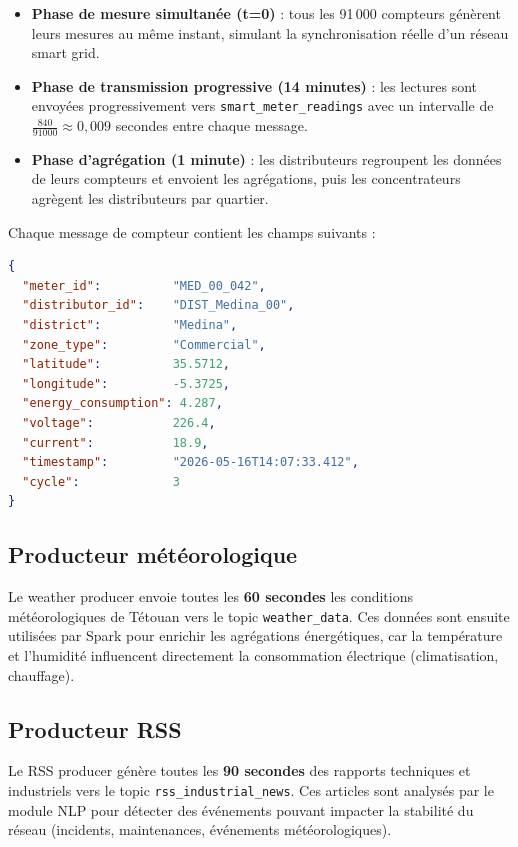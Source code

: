 \documentclass[12pt,a4paper]{report}
\begin{document}
\begin{itemize}
    \item \textbf{Phase de mesure simultanée (t=0)} : tous les 91\,000 compteurs génèrent
    leurs mesures au même instant, simulant la synchronisation réelle d'un réseau smart grid.
    \item \textbf{Phase de transmission progressive (14 minutes)} : les lectures sont envoyées
    progressivement vers \texttt{smart\_meter\_readings} avec un intervalle de
    $\frac{840}{91000} \approx 0{,}009$ secondes entre chaque message.
    \item \textbf{Phase d'agrégation (1 minute)} : les distributeurs regroupent les données de
    leurs compteurs et envoient les agrégations, puis les concentrateurs agrègent les
    distributeurs par quartier.
\end{itemize}

Chaque message de compteur contient les champs suivants :

\begin{lstlisting}[language=json, caption={Structure d'un message smart meter dans Kafka}]
{
  "meter_id":          "MED_00_042",
  "distributor_id":    "DIST_Medina_00",
  "district":          "Medina",
  "zone_type":         "Commercial",
  "latitude":          35.5712,
  "longitude":         -5.3725,
  "energy_consumption": 4.287,
  "voltage":           226.4,
  "current":           18.9,
  "timestamp":         "2026-05-16T14:07:33.412",
  "cycle":             3
}
\end{lstlisting}

\subsection{Producteur météorologique}

Le weather producer envoie toutes les \textbf{60 secondes} les conditions météorologiques
de Tétouan vers le topic \texttt{weather\_data}. Ces données sont ensuite utilisées
par Spark pour enrichir les agrégations énergétiques, car la température et l'humidité
influencent directement la consommation électrique (climatisation, chauffage).

\subsection{Producteur RSS}

Le RSS producer génère toutes les \textbf{90 secondes} des rapports techniques et
industriels vers le topic \texttt{rss\_industrial\_news}. Ces articles sont analysés
par le module NLP pour détecter des événements pouvant impacter la stabilité du réseau
(incidents, maintenances, événements météorologiques).
\end{document}
